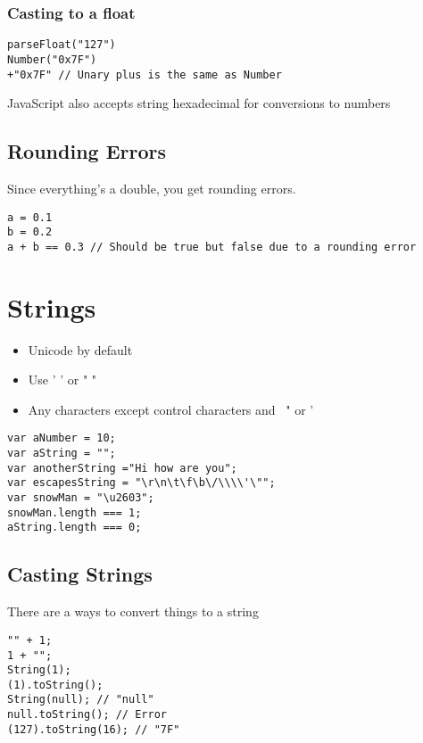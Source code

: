 \documentclass[../CMPUT-404-Notes.tex]{subfiles}
\begin{document}
\subsubsection{Casting to a float}
\begin{verbatim}
parseFloat("127")
Number("0x7F")
+"0x7F" // Unary plus is the same as Number
\end{verbatim}
JavaScript also accepts string hexadecimal for conversions to numbers

\subsection{Rounding Errors}
Since everything's a double, you get rounding errors.
\begin{verbatim}
a = 0.1
b = 0.2
a + b == 0.3 // Should be true but false due to a rounding error
\end{verbatim}

\section{Strings}
\begin{itemize}
    \item Unicode by default
    \item Use ' ' or " "
    \item Any characters except control characters and \, " or '
\end{itemize}

\begin{verbatim}
var aNumber = 10;
var aString = "";
var anotherString ="Hi how are you";
var escapesString = "\r\n\t\f\b\/\\\\'\"";
var snowMan = "\u2603";
snowMan.length === 1;
aString.length === 0;
\end{verbatim}

\subsection{Casting Strings}
There are a ways to convert things to a string 
\begin{verbatim}
"" + 1;
1 + "";
String(1); 
(1).toString();
String(null); // "null"
null.toString(); // Error
(127).toString(16); // "7F"
\end{verbatim}
\end{document}
